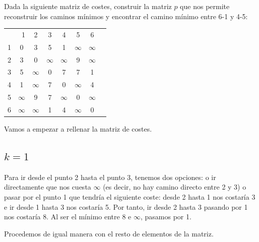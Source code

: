 \documentclass[10pt,a4paper,spanish]{report}
\theoremstyle{definition}
\theoremstyle{remark}
\begin{document}
Dada la siguiente matriz de costes, construir la matriz $p$ que nos permite reconstruir los caminos mínimos y encontrar el camino mínimo entre 6-1 y 4-5:

\begin{center}
\begin{tabular}{c|c|c|c|c|c|c|c|}
\multicolumn{2}{r}{1} & \multicolumn{1}{c}{2} & \multicolumn{1}{c}{3} & \multicolumn{1}{c}{4} & \multicolumn{1}{c}{5} & \multicolumn{1}{c}{6} \\ 
\cline{2-7}
1 & 0 & 3 & 5 & 1 & $\infty$ & $\infty$ \\
\cline{2-7} 
2 & 3 & 0 & $\infty$ & $\infty$ & 9 & $\infty$ \\
\cline{2-7} 
3 & 5 & $\infty$ & 0 & 7 & 7 & 1 \\
\cline{2-7} 
4 & 1 & $\infty$ & 7 & 0 & $\infty$ & 4 \\
\cline{2-7} 
5 & $\infty$ & 9 & 7 & $\infty$ & 0 & $\infty$ \\
\cline{2-7} 
6 & $\infty$ & $\infty$ & 1 & 4 & $\infty$ & 0 \\
\cline{2-7} 
\end{tabular}
\end{center}

Vamos a empezar a rellenar la matriz de costes.

\subsection{$k=1$}
Para ir desde el punto 2 hasta el punto 3, tenemos dos opciones: o ir directamente que nos cuesta $\infty$ (es decir, no hay camino directo entre 2 y 3) o pasar por el punto 1 que tendría el siguiente coste: desde 2 hasta 1 nos costaría 3 e ir desde 1 hasta 3 nos costaría 5. Por tanto, ir desde 2 hasta 3 pasando por 1 nos costaría 8. Al ser el mínimo entre 8 e $\infty$, pasamos por 1.

Procedemos de igual manera con el resto de elementos de la matriz.
\end{document}
